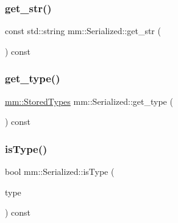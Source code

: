 \mbox{\label{structmm_1_1_serialized_aa3eb7eb50d6b343993c08a4d369af8b2}} 
\subsubsection{\texorpdfstring{get\+\_\+str()}{get\_str()}}
{\footnotesize\ttfamily const std\+::string mm\+::\+Serialized\+::get\+\_\+str (\begin{DoxyParamCaption}{ }\end{DoxyParamCaption}) const\hspace{0.3cm}{\ttfamily [noexcept]}}

\mbox{\label{structmm_1_1_serialized_a9a257b31c4426077a3bd460d1e6cbd89}} 
\subsubsection{\texorpdfstring{get\+\_\+type()}{get\_type()}}
{\footnotesize\ttfamily \hyperlink{namespacemm_ad5a796af6d7145f51e84a73ed35a601c}{mm\+::\+Stored\+Types} mm\+::\+Serialized\+::get\+\_\+type (\begin{DoxyParamCaption}{ }\end{DoxyParamCaption}) const\hspace{0.3cm}{\ttfamily [noexcept]}}

\mbox{\label{structmm_1_1_serialized_ac0e23433a34f0d326042907895a03353}} 
\subsubsection{\texorpdfstring{is\+Type()}{isType()}}
{\footnotesize\ttfamily bool mm\+::\+Serialized\+::is\+Type (\begin{DoxyParamCaption}\item[{\hyperlink{namespacemm_ad5a796af6d7145f51e84a73ed35a601c}{mm\+::\+Stored\+Types}}]{type }\end{DoxyParamCaption}) const\hspace{0.3cm}{\ttfamily [noexcept]}}

